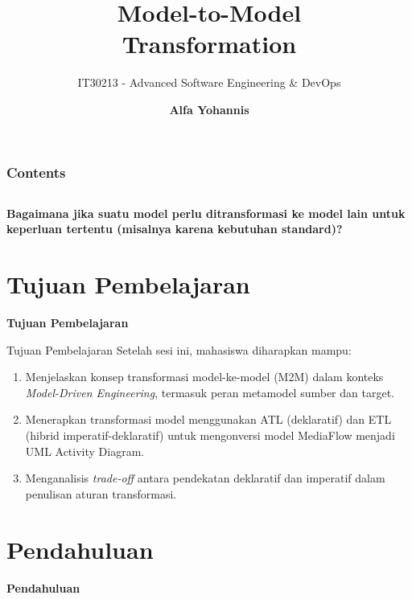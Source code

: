 \documentclass[aspectratio=169, table]{beamer}
\subtitle{IT30213 - Advanced Software Engineering \& DevOps}
\title{\Huge Model-to-Model\vspace{8pt}\\
	Transformation}
\author{\textbf{Alfa Yohannis}}
\begin{document}
\frame{\titlepage}

\begin{frame}[fragile]
	\frametitle{Contents}
	\vspace{20pt}
	\begin{columns}[t]
		\tableofcontents[sections={1-5}]

		\tableofcontents[sections={6-11}]
	\end{columns}
\end{frame}

\begin{frame}{\hfill}
	\centering
	\Huge{\textbf{Bagaimana jika suatu model perlu ditransformasi ke model lain untuk keperluan tertentu (misalnya karena kebutuhan standard)?}}
\end{frame}

\section{Tujuan Pembelajaran}
\begin{frame}{\hfill}
	\centering
	\Huge{\textbf{Tujuan Pembelajaran}}
\end{frame}

\begin{frame}{Tujuan Pembelajaran}
\vspace{6pt}
Setelah sesi ini, mahasiswa diharapkan mampu:
\begin{enumerate}
  \item Menjelaskan konsep transformasi model-ke-model (M2M) dalam konteks \textit{Model-Driven Engineering}, termasuk peran metamodel sumber dan target.
  \item Menerapkan transformasi model menggunakan ATL (deklaratif) dan ETL (hibrid imperatif-deklaratif) untuk mengonversi model MediaFlow menjadi UML Activity Diagram.
  \item Menganalisis \textit{trade-off} antara pendekatan deklaratif dan imperatif dalam penulisan aturan transformasi.
\end{enumerate}
\end{frame}

\section{Pendahuluan}
\begin{frame}{\hfill}
	\centering
	\Huge{\textbf{Pendahuluan}}
\end{frame}
\end{document}
